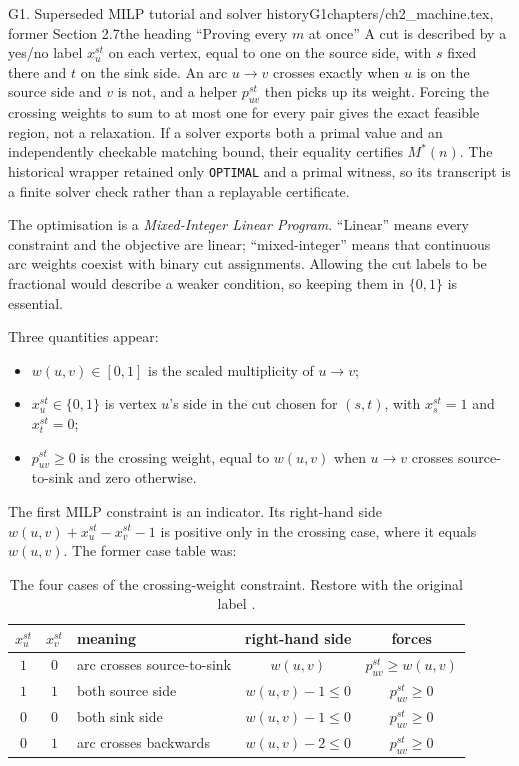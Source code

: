 \begin{offcutrewrite}{G1. Superseded MILP tutorial and solver history}{G1}{chapters/ch2\_machine.tex, former Section 2.7}{the heading ``Proving every $m$ at once''}
A cut is described by a yes/no label $x^{st}_u$ on each vertex, equal to one on the source side, with $s$ fixed there and $t$ on the sink side. An arc $u\to v$ crosses exactly when $u$ is on the source side and $v$ is not, and a helper $p^{st}_{uv}$ then picks up its weight. Forcing the crossing weights to sum to at most one for every pair gives the exact feasible region, not a relaxation. If a solver exports both a primal value and an independently checkable matching bound, their equality certifies $M^*(n)$. The historical wrapper retained only \texttt{OPTIMAL} and a primal witness, so its transcript is a finite solver check rather than a replayable certificate.

The optimisation is a \emph{Mixed-Integer Linear Program}. ``Linear'' means every constraint and the objective are linear; ``mixed-integer'' means that continuous arc weights coexist with binary cut assignments. Allowing the cut labels to be fractional would describe a weaker condition, so keeping them in $\{0,1\}$ is essential.

Three quantities appear:
\begin{itemize}
  \item $w(u,v)\in[0,1]$ is the scaled multiplicity of $u\to v$;
  \item $x^{st}_u\in\{0,1\}$ is vertex $u$'s side in the cut chosen for $(s,t)$, with $x^{st}_s=1$ and $x^{st}_t=0$;
  \item $p^{st}_{uv}\ge0$ is the crossing weight, equal to $w(u,v)$ when $u\to v$ crosses source-to-sink and zero otherwise.
\end{itemize}

The first MILP constraint is an indicator. Its right-hand side $w(u,v)+x^{st}_u-x^{st}_v-1$ is positive only in the crossing case, where it equals $w(u,v)$. The former case table was:

\begin{table}[ht]
\centering
\small
\begin{tabular}{cclcc}
\toprule
$x^{st}_u$ & $x^{st}_v$ & meaning & right-hand side & forces \\
\midrule
$1$ & $0$ & arc crosses source-to-sink & $w(u,v)$ & $p^{st}_{uv}\ge w(u,v)$ \\
$1$ & $1$ & both source side & $w(u,v)-1\le0$ & $p^{st}_{uv}\ge0$ \\
$0$ & $0$ & both sink side & $w(u,v)-1\le0$ & $p^{st}_{uv}\ge0$ \\
$0$ & $1$ & arc crosses backwards & $w(u,v)-2\le0$ & $p^{st}_{uv}\ge0$ \\
\bottomrule
\end{tabular}
\caption{The four cases of the crossing-weight constraint. Restore with the original label .}
\end{table}


\end{offcutrewrite}
